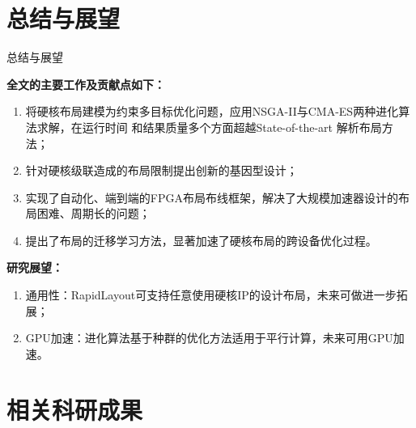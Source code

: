 \documentclass[10pt]{beamer}
\begin{document}
\section{总结与展望}

\begin{frame}{总结与展望}

  {\fontsize{8}{10}\selectfont
  {\bf 全文的主要工作及贡献点如下：}
  \begin{enumerate}
    \setlength\itemsep{1.5em}
    \item 将硬核布局建模为约束多目标优化问题，应用NSGA-II与CMA-ES两种进化算法求解，在运行时间
    和结果质量多个方面超越State-of-the-art 解析布局方法；
    \item 针对硬核级联造成的布局限制提出创新的基因型设计；
    \item 实现了自动化、端到端的FPGA布局布线框架，解决了大规模加速器设计的布局困难、周期长的问题；
    \item 提出了布局的迁移学习方法，显著加速了硬核布局的跨设备优化过程。
  \end{enumerate}

  {\bf 研究展望：}
  \begin{enumerate}
    \setlength\itemsep{1.5em}
    \item 通用性：RapidLayout可支持任意使用硬核IP的设计布局，未来可做进一步拓展；
    \item GPU加速：进化算法基于种群的优化方法适用于平行计算，未来可用GPU加速。
  \end{enumerate}
  }

\end{frame}



\section{相关科研成果}
\end{document}
